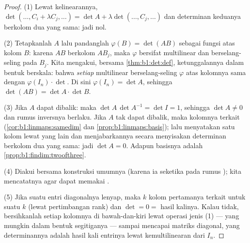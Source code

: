 \begin{proof}
(1) Lewat kelinearannya, $\det(\dots, C_i + \lambda C_j, \dots) = \det A +
\lambda\det(\dots, C_j, \dots)$ dan determinan keduanya berkolom dua
yang sama: jadi nol.

(2) Tetapkanlah $A$ lalu pandanglah $\varphi(B) = \det(AB)$ sebagai fungsi atas
kolom $B$: karena $AB$ berkolom $AB_j$, maka $\varphi$ bersifat
multilinear dan berselang-seling pada $B_j$. Kita mengakui, bersama
\cref{thm:b1:det:def},  ketunggalannya dalam bentuk berskala:
bahwa \emph{setiap}  multilinear berselang-seling $\varphi$ atas kolomnya
sama dengan $\varphi(I_n) \cdot \det$. Di sini $\varphi(I_n) = \det A$, sehingga
$\det(AB) = \det A \cdot \det B$.

(3) Jika $A$ dapat dibalik: maka $\det A\,\det A^{-1} = \det I = 1$, sehingga
$\det A \neq 0$ dan rumus inversnya berlaku. Jika $A$ tak
dapat dibalik, maka kolomnya terkait (\cref{cor:b1:linmaps:samedim}
dan \cref{prop:b1:linmaps:basis}); lalu menyatakan satu kolom lewat
yang lain dan menjabarkannya secara  menyisakan determinan berkolom dua
yang sama: jadi $\det A = 0$. Adapun  basisnya adalah
\cref{prop:b1:findim:twoofthree}.

(4) Diakui bersama konstruksi umumnya (karena ia seketika pada
rumus ); kita mencatatnya agar dapat memakai .

(5) Jika suatu entri diagonalnya lenyap, maka $k$ kolom pertamanya
terkait untuk suatu $k$ (lewat pertimbangan rank) dan $\det = 0 =$ hasil kalinya.
Kalau tidak, bersihkanlah setiap kolomnya di bawah-dan-kiri lewat operasi jenis
(1) --- yang mungkin dalam bentuk segitiganya --- sampai mencapai matriks
diagonal, yang determinannya adalah hasil kali entrinya lewat
kemultilinearan dari $I_n$.
\end{proof}

